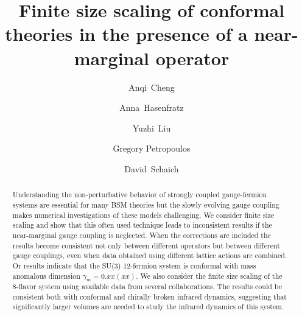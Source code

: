 \documentclass[aps,prl,twocolumn,]{revtex4}  %
\begin{document}
\title{Finite size scaling of conformal theories in the presence of a near-marginal operator}


\author{Anqi~Cheng}
\author{Anna~Hasenfratz}
\author{Yuzhi~Liu}
\author{Gregory Petropoulos}
\author{David~Schaich}

\begin{abstract}
Understanding the non-perturbative behavior of strongly coupled gauge-fermion systems  are essential for many BSM theories  but the  slowly evolving gauge coupling  makes  numerical investigations of these models challenging. We consider finite size scaling and show that this  often used technique leads to inconsistent results if the near-marginal gauge coupling is neglected. When the corrections are included the results become consistent not only between different operators but between different gauge couplings, even when  data obtained using different lattice actions are combined. Or results indicate that the SU(3) 12-fermion system is conformal with mass anomalous dimension $\gamma_m=0.xx(xx)$. We also consider the finite size scaling  of the 8-flavor system using available data from several collaborations. The results could be consistent both with conformal and chirally broken infrared dynamics, suggesting  that significantly larger volumes are needed to study the infrared dynamics of this system. 
\end{abstract}

\maketitle






\end{document}
